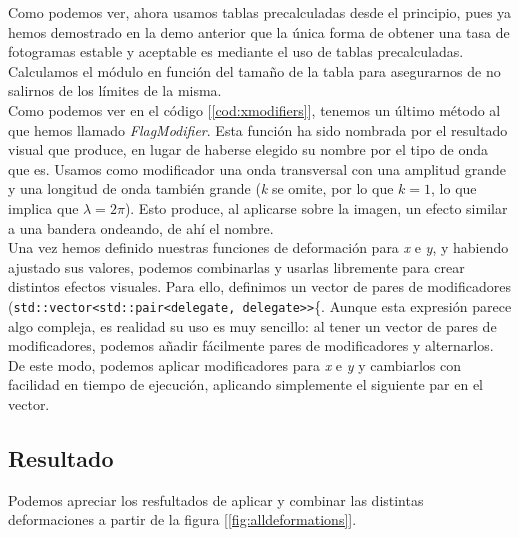 Como podemos ver, ahora usamos tablas precalculadas desde el principio, pues ya hemos demostrado en la demo anterior que la única forma de obtener una tasa de fotogramas estable y aceptable es mediante el uso de tablas precalculadas. Calculamos el módulo en función del tamaño de la tabla para asegurarnos de no salirnos de los límites de la misma.\\

Como podemos ver en el código [\ref{cod:xmodifiers}], tenemos un último método al que hemos llamado \emph{FlagModifier}. Esta función ha sido nombrada por el resultado visual que produce, en lugar de haberse elegido su nombre por el tipo de onda que es. Usamos como modificador una onda transversal con una amplitud grande y una longitud de onda también grande (\emph{k} se omite, por lo que \(k = 1\), lo que implica que \(\lambda = 2 \pi\)). Esto produce, al aplicarse sobre la imagen, un efecto similar a una bandera ondeando, de ahí el nombre.\\

Una vez hemos definido nuestras funciones de deformación para \emph{x} e \emph{y}, y habiendo ajustado sus valores, podemos combinarlas y usarlas libremente para crear distintos efectos visuales. Para ello, definimos un vector de pares de modificadores (\lstinline{std::vector<std::pair<delegate, delegate>>}\{. Aunque esta expresión parece algo compleja, es realidad su uso es muy sencillo: al tener un vector de pares de modificadores, podemos añadir fácilmente pares de modificadores y alternarlos. De este modo, podemos aplicar modificadores para \emph{x} e \emph{y} y cambiarlos con facilidad en tiempo de ejecución, aplicando simplemente el siguiente par en el vector.\\

\subsection{Resultado}

Podemos apreciar los resfultados de aplicar y combinar las distintas deformaciones a partir de la figura [\ref{fig:alldeformations}].

